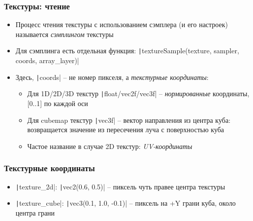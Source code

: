 \documentclass[10pt]{beamer}
\begin{document}
\begin{frame}[fragile]
\frametitle{Текстуры: чтение}
\begin{itemize}
\item Процесс чтения текстуры с использованием сэмплера (и его настроек) называется \textit{сэмплингом} текстуры
\pause
\item Для сэмплинга есть отдельная функция: \texttt|textureSample(texture, sampler, coords, array_layer)|
\pause
\item Здесь, \texttt|coords| -- не номер пикселя, а \textit{текстурные координаты}:
\pause
\begin{itemize}
\item Для 1D/2D/3D текстур \texttt|float/vec2f/vec3f| -- \textit{нормированные} координаты, [0..1] по каждой оси
\pause
\item Для cubemap текстур \texttt|vec3f| -- вектор направления из центра куба: возвращается значение из пересечения луча с поверхностью куба
\pause
\item Частое название в случае 2D текстур: \textit{UV-координаты}
\end{itemize}
\end{itemize}
\end{frame}

\begin{frame}[fragile]
\frametitle{Текстурные координаты}
\begin{itemize}
\item \texttt|texture_2d|: \texttt|vec2(0.6, 0.5)| -- пиксель чуть правее центра текстуры
\pause
\item \texttt|texture_cube|: \texttt|vec3(0.1, 1.0, -0.1)| -- пиксель на +Y грани куба, около центра грани
\end{itemize}
\end{frame}
\end{document}
